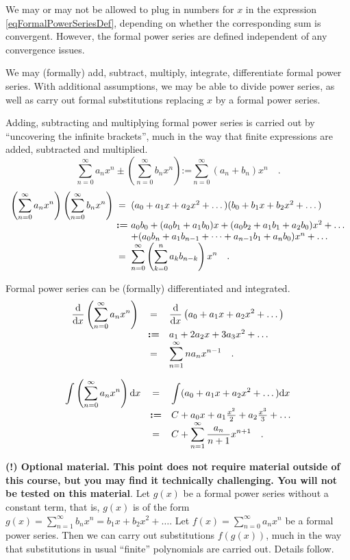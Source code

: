 \documentclass[12pt]{book}
\newcommand{\eqdef}{\textbf{:=}}
\begin{document}
We may or may not be allowed to plug in numbers for $x$ in the expression \eqref{eqFormalPowerSeriesDef}, depending on whether the corresponding sum is convergent. However, the formal power series are defined independent of any convergence issues.

We may (formally) add, subtract, multiply, integrate, differentiate formal power series. With additional assumptions, we may be able to divide power series, as well as carry out formal substitutions replacing $x$ by a formal power series.

Adding, subtracting and multiplying formal power series is carried out by ``uncovering the infinite brackets'', much in the way that finite expressions are added, subtracted and multiplied.
\[
\sum_{n=0}^\infty a_n x^n\pm \left(\sum_{n=0}^\infty b_n x^n\right)\eqdef \sum_{n=0}^\infty (a_n+b_n)x^n\quad .
\]
\[
\begin{array}{r@{~}c@{~}l}
\displaystyle\left(\sum_{n=0}^\infty a_n x^n\right) \left(\sum_{n=0}^\infty b_n x^n\right) &=&
(a_0 + a_1x+a_2x^2+\dots )(b_0 + b_1x+b_2x^2+\dots )\\&\eqdef&
a_0b_0 + (a_0b_1+a_1b_0)x + (a_0b_2+a_1b_1+a_2b_0)x^2+\dots \\
&&+(a_0 b_n +a_1b_{n-1}+\dots + a_{n-1}b_1 +a_nb_0 )x^n+\dots \\
&=&\displaystyle \sum_{n=0}^{\infty} \left(\sum_{k=0}^n a_k b_{n-k}  \right)x^n\quad .
\end{array}
\]

Formal power series can be (formally) differentiated and integrated.
\[
\begin{array}{rcl}
\displaystyle
\frac{\diff}{\diff x}\left(\sum_{n=0}^{\infty} a_n x^n\right) &=& \displaystyle \frac{\diff}{\diff x} \left(a_0 +a_1x+a_2x^2+\dots \right)\\
&\eqdef& a_1+2 a_2 x+ 3a_3x^2 +\dots\\
&=&\displaystyle \sum_{n=1}^{\infty} na_nx^{n-1}\quad .
\end{array}
\]

\[
\begin{array}{rcl}
\displaystyle \int \left(\sum_{n=0}^{\infty} a_n x^n\right)\diff x &=& \displaystyle \int (a_0 +a_1x+a_2x^2+\dots )\diff x\\
&\eqdef& C+ a_0x +a_1\frac{x^2}{2}+a_2\frac{x^3}3+\dots\\
&=&\displaystyle C+\sum_{n=1}^{\infty} \frac{a_n}{n+1}x^{n+1}\quad .
\end{array}
\]

\textbf{(!) Optional material. This point does not require material outside of this course, but you may find it technically challenging. You will not be tested on this material}. Let $g(x)$ be a formal power series without a constant term, that is, $g(x)$ is of the form $g(x)=\sum_{n=1}^\infty b_n x^n=  b_1x+b_2x^2+\dots$. Let $f(x)=\sum_{n=0}^{\infty} a_n x^n$ be a formal power series. Then we can carry out substitutions $f(g(x))$, much in the way that substitutions in usual ``finite'' polynomials are carried out. Details follow.
\end{document}
